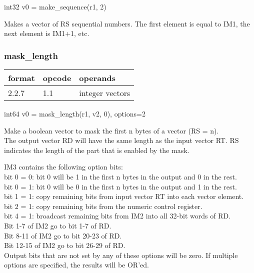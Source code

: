 \documentclass[forwardcom.tex]{subfiles}
\begin{document}
int32 v0 = make\_sequence(r1, 2)
\vspace{2mm}

Makes a vector of RS sequential numbers. 
The first element is equal to IM1, the next element is IM1+1, etc.

\subsubsection{mask\_length}
\label{table:maskLengthInstruction}
\begin{tabular}{|p{12mm}|p{12mm}|p{110mm}|}
\hline
\bfseries format & \bfseries opcode & \bfseries operands \\ \hline
2.2.7 & 1.1 & integer vectors \\ \hline
\end{tabular}
\vspace{2mm}

int64 v0 = mask\_length(r1, v2, 0), options=2
\vspace{2mm}

Make a boolean vector to mask the first n bytes of a vector (RS = n). \\
The output vector RD will have the same length as the input vector RT. RS indicates the length of the part that is enabled by the mask. 
\vspace{2mm}

IM3 contains the following option bits: \\
bit 0 = 0: bit 0 will be 1 in the first n bytes in the output and 0 in the rest. \\
bit 0 = 1: bit 0 will be 0 in the first n bytes in the output and 1 in the rest. \\
bit 1 = 1: copy remaining bits from input vector RT into each vector element. \\
bit 2 = 1: copy remaining bits from the numeric control register. \\
bit 4 = 1: broadcast remaining bits from IM2 into all 32-bit words of RD. \\
\hspace{17mm} Bit 1-7 of IM2 go to bit 1-7 of RD. \\
\hspace{17mm} Bit 8-11 of IM2 go to bit 20-23 of RD. \\
\hspace{17mm} Bit 12-15 of IM2 go to bit 26-29 of RD. \\
Output bits that are not set by any of these options will be zero. 
If multiple options are specified, the results will be OR'ed.
\end{document}
